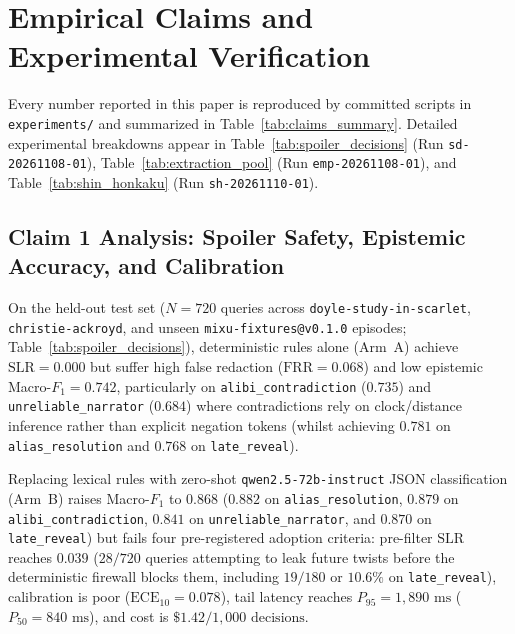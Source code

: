 \documentclass[11pt,twocolumn]{article}
\begin{document}


\section{Empirical Claims and Experimental Verification}
\label{sec:empirical_claims}

Every number reported in this paper is reproduced by committed scripts in \texttt{experiments/} and summarized in Table~\ref{tab:claims_summary}. Detailed experimental breakdowns appear in Table~\ref{tab:spoiler_decisions} (Run \texttt{sd-20261108-01}), Table~\ref{tab:extraction_pool} (Run \texttt{emp-20261108-01}), and Table~\ref{tab:shin_honkaku} (Run \texttt{sh-20261110-01}).



\subsection{Claim 1 Analysis: Spoiler Safety, Epistemic Accuracy, and Calibration}
\label{sec:claim1}

On the held-out test set ($N = 720$ queries across \texttt{doyle-study-in-scarlet}, \texttt{christie-ackroyd}, and unseen \texttt{mixu-fixtures@v0.1.0} episodes; Table~\ref{tab:spoiler_decisions}), deterministic rules alone (Arm~A) achieve $\text{SLR} = 0.000$ but suffer high false redaction ($\text{FRR} = 0.068$) and low epistemic Macro-$F_1 = 0.742$, particularly on \texttt{alibi\_contradiction} ($0.735$) and \texttt{unreliable\_narrator} ($0.684$) where contradictions rely on clock/distance inference rather than explicit negation tokens (whilst achieving $0.781$ on \texttt{alias\_resolution} and $0.768$ on \texttt{late\_reveal}).

Replacing lexical rules with zero-shot \texttt{qwen2.5-72b-instruct} JSON classification (Arm~B) raises Macro-$F_1$ to $0.868$ ($0.882$ on \texttt{alias\_resolution}, $0.879$ on \texttt{alibi\_contradiction}, $0.841$ on \texttt{unreliable\_narrator}, and $0.870$ on \texttt{late\_reveal}) but fails four pre-registered adoption criteria: pre-filter $\text{SLR}$ reaches $0.039$ ($28/720$ queries attempting to leak future twists before the deterministic firewall blocks them, including $19/180$ or $10.6\%$ on \texttt{late\_reveal}), calibration is poor ($\text{ECE}_{10} = 0.078$), tail latency reaches $P_{95} = 1{,}890\text{ ms}$ ($P_{50} = 840\text{ ms}$), and cost is $\$1.42 / 1{,}000\text{ decisions}$.
\end{document}
